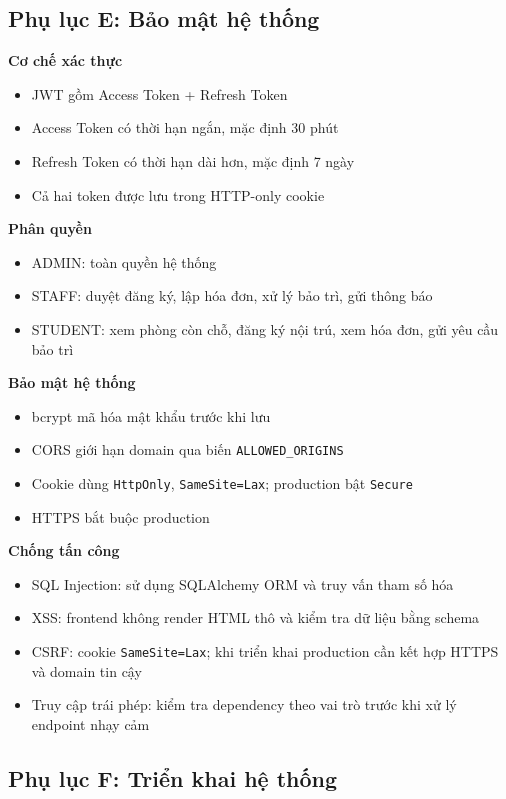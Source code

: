 \documentclass[13pt,a4paper]{extarticle}
\numberwithin{figure}{section}
\numberwithin{table}{section}
\begin{document}
	\subsection*{Phụ lục E: Bảo mật hệ thống}
	
	\noindent
	\textbf{Cơ chế xác thực}
	\begin{itemize}
		\item JWT gồm Access Token + Refresh Token
		\item Access Token có thời hạn ngắn, mặc định 30 phút
		\item Refresh Token có thời hạn dài hơn, mặc định 7 ngày
		\item Cả hai token được lưu trong HTTP-only cookie
	\end{itemize}
	
	\noindent
	\textbf{Phân quyền}
	\begin{itemize}
		\item ADMIN: toàn quyền hệ thống
		\item STAFF: duyệt đăng ký, lập hóa đơn, xử lý bảo trì, gửi thông báo
		\item STUDENT: xem phòng còn chỗ, đăng ký nội trú, xem hóa đơn, gửi yêu cầu bảo trì
	\end{itemize}
	
	\noindent
	\textbf{Bảo mật hệ thống}
	\begin{itemize}
		\item bcrypt mã hóa mật khẩu trước khi lưu
		\item CORS giới hạn domain qua biến \texttt{ALLOWED\_ORIGINS}
		\item Cookie dùng \texttt{HttpOnly}, \texttt{SameSite=Lax}; production bật \texttt{Secure}
		\item HTTPS bắt buộc production
	\end{itemize}
	
	\noindent
	\textbf{Chống tấn công}
	\begin{itemize}
		\item SQL Injection: sử dụng SQLAlchemy ORM và truy vấn tham số hóa
		\item XSS: frontend không render HTML thô và kiểm tra dữ liệu bằng schema
		\item CSRF: cookie \texttt{SameSite=Lax}; khi triển khai production cần kết hợp HTTPS và domain tin cậy
		\item Truy cập trái phép: kiểm tra dependency theo vai trò trước khi xử lý endpoint nhạy cảm
	\end{itemize}
	
	\subsection*{Phụ lục F: Triển khai hệ thống}
	
\end{document}
